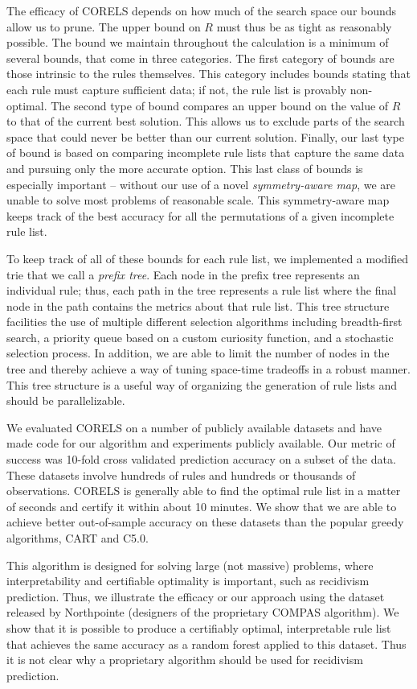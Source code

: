 The efficacy of CORELS depends on how much of the search space our bounds allow us to prune. The upper bound on $R$ must thus be as tight as reasonably possible. The bound we maintain throughout the calculation is a minimum of several bounds, that come in three categories. The first category of bounds are those intrinsic to the rules themselves. This category includes bounds stating that each rule must capture sufficient data; if not, the rule list is provably non-optimal. The second type of bound compares an upper bound on the value of $R$ to that of the current best solution. This allows us to exclude parts of the search space that could never be better than our current solution. Finally, our last type of bound is based on comparing incomplete rule lists that capture the same data and pursuing only the more accurate option. This last class of bounds is especially important -- without our use of a novel \textit{symmetry-aware map}, we are unable to solve most problems of reasonable scale. This symmetry-aware map keeps track of the best accuracy for all the permutations of a given incomplete rule list.

To keep track of all of these bounds for each rule list, we implemented a modified trie that we call a \emph{prefix tree}. Each node in the prefix tree represents an individual rule; thus, each path in the tree represents a rule list where the final node in the path contains the metrics about that rule list. This tree structure facilities the use of multiple different selection algorithms including breadth-first search, a priority queue based on a custom curiosity function, and a stochastic selection process. In addition, we are able to limit the number of nodes in the tree and thereby achieve a way of tuning space-time tradeoffs in a robust manner. This tree structure is a useful way of organizing the generation of rule lists and should be parallelizable.

\begin{arxiv}
We evaluated CORELS on a number of publicly available datasets and have made code for our algorithm and experiments publicly available. Our metric of success was 10-fold cross validated prediction accuracy on a subset of the data. These datasets involve hundreds of rules and hundreds or thousands of observations. CORELS is generally able to find the optimal rule list in a matter of seconds and certify it within about 10 minutes. We show that we are able to achieve better out-of-sample accuracy on these datasets than the popular greedy algorithms, CART and C5.0.
\end{arxiv}

This algorithm is designed for solving large (not massive) problems, where interpretability and certifiable optimality is important, such as recidivism prediction. Thus, we illustrate the efficacy or our approach using the dataset released by Northpointe (designers of the proprietary COMPAS algorithm). We show that it is possible to produce a certifiably optimal, interpretable rule list that achieves the same accuracy as a random forest applied to this dataset.
%
Thus it is not clear why a proprietary algorithm should be used for recidivism prediction.

%
%
%
%
